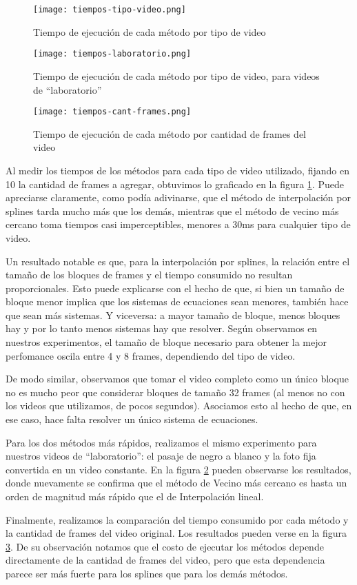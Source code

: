 \begin{figure}[h!]
  \centering
    \texttt{[image: tiempos-tipo-video.png]}
     \caption{Tiempo de ejecución de cada método por tipo de video}\label{fig:tiempos}
\end{figure}
\noindent


\begin{figure}[h!]
  \centering
    \texttt{[image: tiempos-laboratorio.png]}
     \caption{Tiempo de ejecución de cada método por tipo de video, para videos de ``laboratorio''}\label{fig:tiempos-lab}
\end{figure}
\noindent

\begin{figure}[h!]
  \centering
    \texttt{[image: tiempos-cant-frames.png]}
     \caption{Tiempo de ejecución de cada método por cantidad de frames del video}\label{fig:tiempos-cant-frames}
\end{figure}
\noindent


Al medir los tiempos de los métodos para cada tipo de video utilizado, fijando en 10 la cantidad de frames a agregar, obtuvimos lo graficado en la figura \ref{fig:tiempos}. Puede apreciarse claramente, como podía adivinarse, que el método de interpolación por splines tarda mucho más que los demás, mientras que el método de vecino más cercano toma tiempos casi imperceptibles, menores a 30ms para cualquier tipo de video.

Un resultado notable es que, para la interpolación por splines, la relación entre el tamaño de los bloques de frames y el tiempo consumido no resultan proporcionales. Esto puede explicarse con el hecho de que, si bien un tamaño de bloque menor implica que los sistemas de ecuaciones sean menores, también hace que sean más sistemas. Y viceversa: a mayor tamaño de bloque, menos bloques hay y por lo tanto menos sistemas hay que resolver. Según observamos en nuestros experimentos, el tamaño de bloque necesario para obtener la mejor perfomance oscila entre 4 y 8 frames, dependiendo del tipo de video.

De modo similar, observamos que tomar el video completo como un único bloque no es mucho peor que considerar bloques de tamaño 32 frames (al menos no con los videos que utilizamos, de pocos segundos). Asociamos esto al hecho de que, en ese caso, hace falta resolver un único sistema de ecuaciones.

Para los dos métodos más rápidos, realizamos el mismo experimento para nuestros videos de ``laboratorio'': el pasaje de negro a blanco y la foto fija convertida en un video constante. En la figura \ref{fig:tiempos-lab} pueden observarse los resultados, donde nuevamente se confirma que el método de Vecino más cercano es hasta un orden de magnitud más rápido que el de Interpolación lineal.

Finalmente, realizamos la comparación del tiempo consumido por cada método y la cantidad de frames del video original. Los resultados pueden verse en la figura \ref{fig:tiempos-cant-frames}. De su observación notamos que el costo de ejecutar los métodos depende directamente de la cantidad de frames del video, pero que esta dependencia parece ser más fuerte para los splines que para los demás métodos.